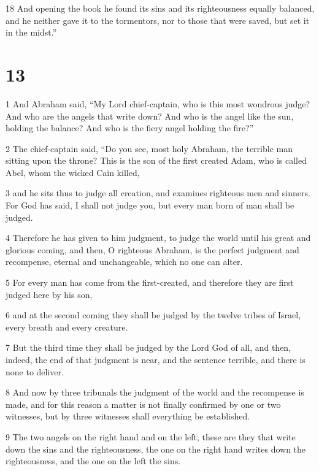 \par 18 And opening the book he found its sins and its righteousness equally balanced, and he neither gave it to the tormentors, nor to those that were saved, but set it in the midst.”


\chapter{13}

\par 1 And Abraham said, “My Lord chief-captain, who is this most wondrous judge? And who are the angels that write down? And who is the angel like the sun, holding the balance? And who is the fiery angel holding the fire?” 

\par 2 The chief-captain said, “Do you see, most holy Abraham, the terrible man sitting upon the throne? This is the son of the first created Adam, who is called Abel, whom the wicked Cain killed, 

\par 3 and he sits thus to judge all creation, and examines righteous men and sinners. For God has said, I shall not judge you, but every man born of man shall be judged. 

\par 4 Therefore he has given to him judgment, to judge the world until his great and glorious coming, and then, O righteous Abraham, is the perfect judgment and recompense, eternal and unchangeable, which no one can alter. 

\par 5 For every man has come from the first-created, and therefore they are first judged here by his son, 

\par 6 and at the second coming they shall be judged by the twelve tribes of Israel, every breath and every creature. 

\par 7 But the third time they shall be judged by the Lord God of all, and then, indeed, the end of that judgment is near, and the sentence terrible, and there is none to deliver. 

\par 8 And now by three tribunals the judgment of the world and the recompense is made, and for this reason a matter is not finally confirmed by one or two witnesses, but by three witnesses shall everything be established. 

\par 9 The two angels on the right hand and on the left, these are they that write down the sins and the righteousness, the one on the right hand writes down the righteousness, and the one on the left the sins. 

